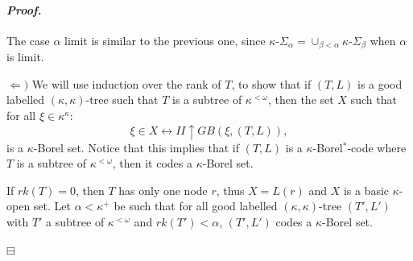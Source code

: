 \documentclass[12pt,a4paper]{amsart}
\theoremstyle{definition}
\theoremstyle{remark}
\newenvironment{cproof}{\paragraph{\emph{Proof.\,}}}{\hfill{$\boxminus$}\par\vspace{2mm}}
\def\borelstar{Borel\nobreak\hspace{1pt}$^*$}
\begin{document}
\begin{cproof}

The case $\alpha$ limit is similar to the previous one, since $\kappa$-$\Sigma_{\alpha}=\cup_{\beta<\alpha}\kappa\text{-}\Sigma_{\beta}$ when $\alpha$ is limit.

$\Leftarrow)$ We will use induction over the rank of $T$, to show that if $(T,L)$ is a good labelled $(\kappa,\kappa)$-tree such that $T$ is a subtree of $\kappa^{<\omega}$, then the set $X$ such that for all $\xi\in\kappa^\kappa$: 
$$\xi\in X\leftrightarrow II\uparrow GB(\xi,(T,L)),$$ is a $\kappa$-Borel set. Notice that this implies that if $(T,L)$ is a $\kappa$-\borelstar-code where $T$ is a subtree of $\kappa^{<\omega}$, then it codes a $\kappa$-Borel set.

If $rk(T)=0$, then $T$ has only one node $r$, thus $X=L(r)$ and $X$ is a basic $\kappa$-open set. Let $\alpha<\kappa^+$ be such that for all good labelled $(\kappa,\kappa)$-tree $(T',L')$ with $T'$ a subtree of $\kappa^{<\omega}$ and $rk(T')<\alpha$, $(T',L')$ codes a $\kappa$-Borel set. 
 

\end{cproof}
\end{document}
